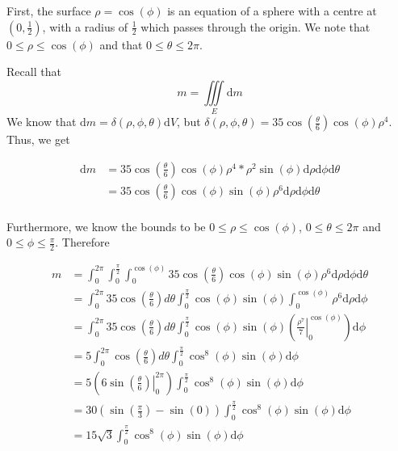 \documentclass[11pt]{article}
\theoremstyle{plain} %
\theoremstyle{definition}
\theoremstyle{example}
\theoremstyle{remark}
\begin{document}
First, the surface $\rho = \cos(\phi)$ is an equation of a sphere with a centre at $\left(0, \frac{1}{2}\right)$, with a radius of $\frac{1}{2}$ which passes through the origin. We note that $0 \leq \rho \leq \cos(\phi)$ and that $0 \leq \theta \leq 2 \pi$. 

Recall that $$m = \iiint \limits_E \mathrm d m$$ We know that $\mathrm d m = \delta(\rho, \phi, \theta) \mathrm d V$, but $\delta(\rho, \phi, \theta) = 35 \cos(\frac{\theta}{6})\cos(\phi)\rho^4$. Thus, we get

\begin{align*}
	\mathrm d m &= 35\cos\left(\frac{\theta}{6}\right)\cos(\phi)\rho^4* \rho^2 \sin(\phi) \mathrm d \rho \mathrm d \phi \mathrm d \theta\\
	&= 35 \cos\left(\frac{\theta}{6}\right)\cos(\phi)\sin(\phi)\rho^6\mathrm d \rho \mathrm d \phi \mathrm d \theta \\
\end{align*}

Furthermore, we know the bounds to be $0 \leq \rho \leq \cos(\phi)$, $0 \leq \theta \leq 2 \pi$ and $0 \leq \phi \leq \frac{\pi}{2}$. Therefore

\begin{align*}
	m &= \int_0^{2\pi}\int_0^{\frac{\pi}{2}}\int_0^{\cos(\phi)} 35 \cos\left(\frac{\theta}{6}\right)\cos(\phi)\sin(\phi)\rho^6\mathrm d \rho \mathrm d \phi \mathrm d \theta\\
	&= \int_0^{2\pi}35 \cos\left(\frac{\theta}{6}\right)d \theta\int_0^{\frac{\pi}{2}}\cos(\phi)\sin(\phi) \int_0^{\cos(\phi)} \rho^6\mathrm d \rho \mathrm d \phi\\
	&= \int_0^{2\pi}35 \cos\left(\frac{\theta}{6}\right)d \theta\int_0^{\frac{\pi}{2}}\cos(\phi)\sin(\phi) \left(\left.\frac{\rho^7}{7}\right|_0^{\cos(\phi)}\right)\mathrm d \phi\\
	&= 5\int_0^{2\pi}\cos\left(\frac{\theta}{6}\right)d \theta\int_0^{\frac{\pi}{2}}\cos^8(\phi)\sin(\phi)\mathrm d \phi \\
	&= 5\left(\left.6\sin\left(\frac{\theta}{6}\right)\right|_0^{2\pi}\right)\int_0^{\frac{\pi}{2}}\cos^8(\phi)\sin(\phi)\mathrm d \phi \\
	&= 30\left(\sin\left(\frac{\pi}{3}\right)-\sin(0)\right)\int_0^{\frac{\pi}{2}}\cos^8(\phi)\sin(\phi)\mathrm d \phi \\
	&= 15\sqrt{3}\int_0^{\frac{\pi}{2}}\cos^8(\phi)\sin(\phi)\mathrm d \phi \\
\end{align*}
\end{document}
